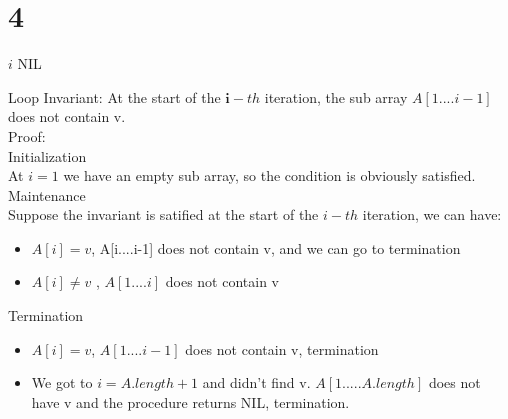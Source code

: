 \documentclass{article}
\begin{document}
\section*{4}
\begin{algorithmic}
				\State \Return $i$
			\EndIf
		\EndFor
		\State \Return NIL
	\EndProcedure
\end{algorithmic}
Loop Invariant: At the start of the $\textbf{i}-th$ iteration, the sub array $A[1....i-1]$ does not contain v.\\
Proof:\\
Initialization\\
At $i = 1$ we have an empty sub array, so the condition is obviously satisfied.\\
Maintenance \\ 
Suppose the invariant is satified at the start of the $i-th$ iteration, we can have:\\
\begin{itemize} 
	\item $A[i] = v$, A[i....i-1] does not contain v, and we can go to termination
	\item  $A[i] \neq v$ , $A[1....i]$ does not contain v
\end{itemize}
Termination 
\begin{itemize}
	\item $A[i] = v$, $A[1....i-1]$ does not contain v, termination
	\item We got to $i = A .length + 1$ and didn't find v. $A[1.....A.length]$ does not have v and the procedure returns NIL, termination.
\end{itemize}
\end{document}
